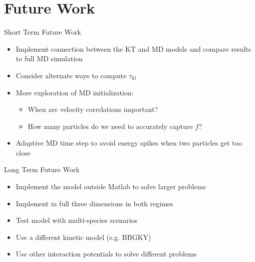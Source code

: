 \documentclass{beamer}
\begin{document}
	\section{Future Work}
	\begin{frame}{Short Term Future Work}
		\begin{itemize}
			\item Implement connection between the KT and MD models and compare results to full MD simulation
			\vspace{0.5em}
			\item Consider alternate ways to compute $\tau_{kl}$
			\vspace{0.5em}
			\item More exploration of MD initialization:
			\vspace{0.5em}
			\begin{itemize}
				\item When are velocity correlations important?
				\vspace{0.5em}
				\item How many particles do we need to accurately capture $f$?
			\end{itemize}
			\vspace{0.5em}
			\item Adaptive MD time step to avoid energy spikes when two particles get too close
		\end{itemize}
	\end{frame}
	
	\begin{frame}{Long Term Future Work}
		\begin{itemize}
			\item Implement the model outside Matlab to solve larger problems
			\vspace{1em}
			\item Implement in full three dimensions in both regimes
			\vspace{1em}
			\item Test model with multi-species scenarios
			\vspace{1em}
			\item Use a different kinetic model (e.g. BBGKY)
			\vspace{1em}
			\item Use other interaction potentials to solve different problems			
			
		\end{itemize}
	\end{frame}
	
\end{document}
